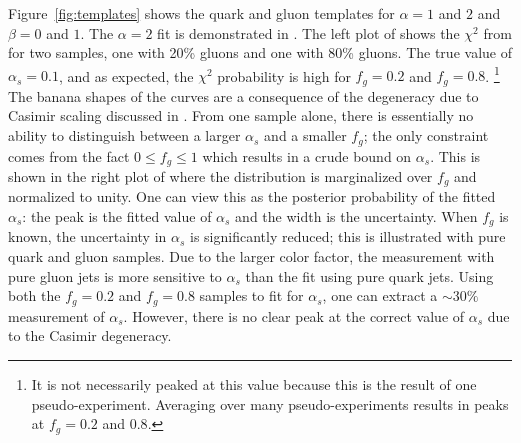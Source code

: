 Figure~\ref{fig:templates} shows the quark and gluon templates for $\alpha=1$ and $2$ and $\beta=0$ and $1$.
%
The $\alpha=2$ fit is demonstrated in .
%
The left plot of  shows the $\chi^2$ from  for two samples, one with 20\% gluons and one with 80\% gluons.
%
The true value of $\alpha_s=0.1$, and as expected, the $\chi^2$ probability is high for $f_g=0.2$ and $f_g=0.8$.%
\footnote{It is not necessarily peaked at this value because this is the result of one pseudo-experiment.  Averaging over many pseudo-experiments results in peaks at $f_g=0.2$ and $0.8$.}
%
The banana shapes of the curves are a consequence of the degeneracy due to Casimir scaling discussed in .
%
From one sample alone, there is essentially no ability to distinguish between a larger $\alpha_s$ and a smaller $f_g$; the only constraint comes from the fact $0\leq f_g\leq 1$ which results in a crude bound on $\alpha_s$.
%
This is shown in the right plot of  where the distribution is marginalized over $f_g$ and normalized to unity.
%
One can view this as the posterior probability of the fitted $\alpha_s$: the peak is the fitted value of $\alpha_s$ and the width is the uncertainty.
%
When $f_g$ is known, the uncertainty in $\alpha_s$ is significantly reduced; this is illustrated with pure quark and gluon samples.
%
Due to the larger color factor, the measurement with pure gluon jets is more sensitive to $\alpha_s$ than the fit using pure quark jets.
%
Using both the $f_g=0.2$ and $f_g=0.8$ samples to fit for $\alpha_s$, one can extract a $\sim 30\%$ measurement of $\alpha_s$.
%
However, there is no clear peak at the correct value of $\alpha_s$ due to the Casimir degeneracy.  


